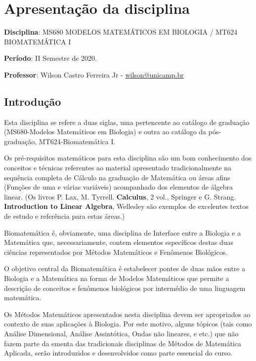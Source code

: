 
\chapter*{Apresentação da disciplina}

\begin{description}
\item \textbf{Disciplina}:
\subitem MS680 MODELOS MATEMÁTICOS EM BIOLOGIA /
\subitem MT624 BIOMATEMÁTICA I
\item \textbf{Período}: II Semestre de 2020.
\item \textbf{Professor}: Wilson Castro Ferreira Jr -
\href{mailto:wilson@unicamp.br}{wilson@unicamp.br}
\end{description}



\section{Introdução}

Esta disciplina se refere a duas siglas, uma pertencente ao catálogo de graduação (MS680-Modelos Matemáticos em Biologia) e outra ao catálogo da pós-graduação, MT624-Biomatemática I.

Os pré-requisitos matemáticos para esta disciplina são um bom conhecimento dos conceitos e técnicas referentes ao material apresentado tradicionalmente na sequência completa de Cálculo na graduação de Matemática ou áreas afins (Funções de uma e várias variáveis) acompanhado dos elementos de álgebra linear. (Os livros P. Lax, M. Tyrrell. \textbf{Calculus}, 2 vol., Springer e G. Strang. \textbf{Introduction to Linear Algebra}, Wellesley são exemplos de excelentes textos de estudo e referência para estas áreas.)

Biomatemática é, obviamente, uma disciplina de Interface entre a Biologia e a Matemática que, necessariamente, contem elementos específicos destas duas ciências representados por Métodos Matemáticos e Fenômenos Biológicos.

O objetivo central da Biomatemática é estabelecer pontes de duas mãos entre a Biologia e a Matemática na forma de Modelos Matemáticos que permite a descrição de conceitos e fenômenos biológicos por intermédio de uma linguagem matemática.

Os Métodos Matemáticos apresentados nesta disciplina devem ser apropriados ao contexto de suas aplicações à Biologia. Por este motivo, alguns tópicos (tais como Análise Dimensional, Análise Assintótica, Ondas não lineares, e etc.) que não fazem parte da ementa das tradicionais disciplinas de Métodos de Matemática Aplicada, serão introduzidos e desenvolvidos como parte essencial do curso.


